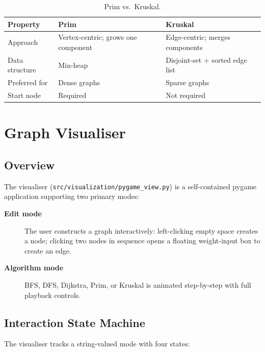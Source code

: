 \documentclass[12pt, a4paper]{article}
\begin{document}
\begin{table}[H]
\centering
\caption{Prim vs.\ Kruskal.}
\begin{tabularx}{\linewidth}{@{}L{3.2cm}L{4.4cm}L{4.9cm}@{}}
\toprule
\textbf{Property} & \textbf{Prim} & \textbf{Kruskal} \\
\midrule
Approach       & Vertex-centric; grows one component & Edge-centric; merges components \\
Data structure & Min-heap                            & Disjoint-set + sorted edge list \\
Preferred for  & Dense graphs                        & Sparse graphs \\
Start node     & Required                            & Not required \\
\bottomrule
\end{tabularx}
\end{table}

\section{Graph Visualiser}
\label{sec:viz}

\subsection{Overview}

The visualiser (\texttt{src/visualization/pygame\_view.py}) is a
self-contained pygame application supporting two primary modes:

\begin{description}
    \item[\textbf{Edit mode}] The user constructs a graph interactively:
          left-clicking empty space creates a node; clicking two nodes in
          sequence opens a floating weight-input box to create an edge.
    \item[\textbf{Algorithm mode}] BFS, DFS, Dijkstra, Prim, or Kruskal
          is animated step-by-step with full playback controls.
\end{description}

\subsection{Interaction State Machine}

The visualiser tracks a string-valued mode with four states:
\end{document}

